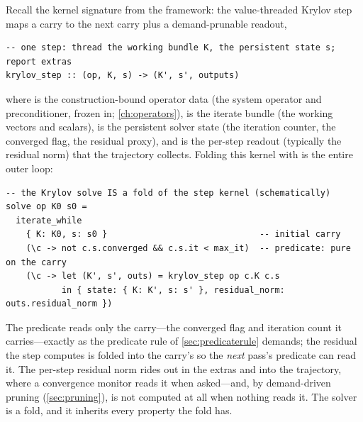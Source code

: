 Recall the kernel signature from the framework: the value-threaded Krylov step
maps a carry to the next carry plus a demand-prunable readout,
\begin{lstlisting}[style=l4style]
-- one step: thread the working bundle K, the persistent state s; report extras
krylov_step :: (op, K, s) -> (K', s', outputs)
\end{lstlisting}
where  is the construction-bound operator data (the system operator and
preconditioner, frozen in; \cref{ch:operators}),  is the iterate bundle
(the working vectors and scalars),  is the persistent solver state (the
iteration counter, the converged flag, the residual proxy), and  is
the per-step readout (typically the residual norm) that the trajectory collects.
Folding this kernel with  is the entire outer loop:
\begin{lstlisting}[style=l4style]
-- the Krylov solve IS a fold of the step kernel (schematically)
solve op K0 s0 =
  iterate_while
    { K: K0, s: s0 }                              -- initial carry
    (\c -> not c.s.converged && c.s.it < max_it)  -- predicate: pure on the carry
    (\c -> let (K', s', outs) = krylov_step op c.K c.s
           in { state: { K: K', s: s' }, residual_norm: outs.residual_norm })
\end{lstlisting}
The predicate reads only the carry---the converged flag and iteration count it
carries---exactly as the predicate rule of \cref{sec:predicaterule} demands; the
residual the step computes is folded into the carry's  so the \emph{next}
pass's predicate can read it. The per-step residual norm rides out in the extras and
into the trajectory, where a convergence monitor reads it when asked---and, by
demand-driven pruning (\cref{sec:pruning}), is not computed at all when nothing
reads it. The solver is a fold, and it inherits every property the fold has.

